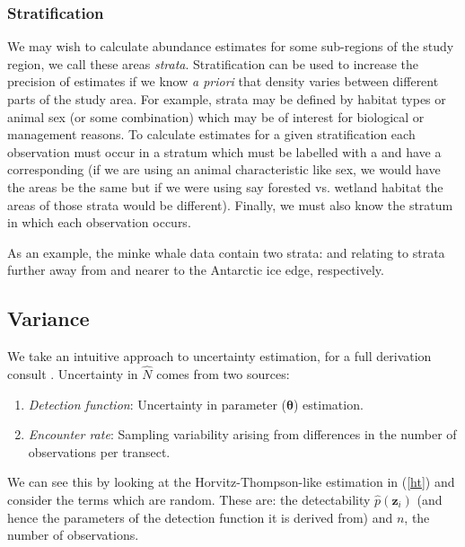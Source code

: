 \documentclass[article]{jss}
\begin{document}
\subsubsection{Stratification}

We may wish to calculate abundance estimates for some sub-regions of the study region, we call these areas \textit{strata}. Stratification can be used to increase the precision of estimates if we know \textit{a priori} that density varies between different parts of the study area. For example, strata may be defined by habitat types or animal sex (or some combination) which may be of interest for biological or management reasons. To calculate estimates for a given stratification each observation must occur in a stratum which must be labelled with a  and have a corresponding  (if we are using an animal characteristic like sex, we would have the areas be the same but if we were using say forested vs. wetland habitat the areas of those strata would be different). Finally, we must also know the stratum in which each observation occurs.

As an example, the minke whale data contain two strata:  and  relating to strata further away from and nearer to the Antarctic ice edge, respectively.

\subsection{Variance}

We take an intuitive approach to uncertainty estimation, for a full derivation consult \cite{Marques:2003vb}. Uncertainty in $\hat{N}$ comes from two sources:

\begin{enumerate}
\item \textit{Detection function}: Uncertainty in parameter ($\boldsymbol{\theta}$) estimation.
\item \textit{Encounter rate}: Sampling variability arising from differences in the number of observations per transect.
\end{enumerate}

We can see this by looking at the Horvitz-Thompson-like estimation in (\ref{ht}) and consider the terms which are random. These are: the detectability $\hat{p}(\mathbf{z}_i)$ (and hence the parameters of the detection function it is derived from) and $n$, the number of observations.
\end{document}
